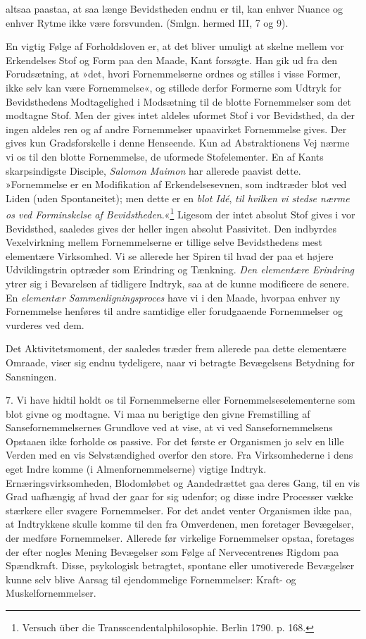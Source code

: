 \documentclass[12pt,a4paper,openany]{book}
\newcommand{\opage}[1]{\marginnote{\footnotesize\textit{[#1]}}}
\begin{document}
altsaa paastaa, at saa længe Bevidstheden endnu er til, kan enhver
Nuance og enhver Rytme ikke være forsvunden. (Smlgn. hermed III, 7 og
9).

En vigtig Følge af Forholdsloven er, at det bliver umuligt at skelne
mellem vor Erkendelses Stof og Form paa den Maade, Kant forsøgte. Han
gik ud fra den Forudsætning, at »det, hvori Fornemmelserne ordnes og
stilles i visse Former, ikke selv kan være Fornemmelse«, og stillede
derfor Formerne som Udtryk for Bevidsthedens Modtagelighed i Modsætning
til de blotte Fornemmelser som det modtagne Stof. Men der gives intet
aldeles uformet Stof i vor Bevidsthed, da der ingen
\opage{144}aldeles ren og af andre Fornemmelser upaavirket Fornemmelse
gives. Der gives kun Gradsforskelle i denne Henseende. Kun ad
Abstraktionens Vej nærme vi os til den blotte Fornemmelse, de uformede
Stofelementer. En af Kants skarpsindigste Disciple, \emph{Salomon
Maimon} har allerede paavist dette. »Fornemmelse er en Modifikation af
Erkendelsesevnen, som indtræder blot ved Liden (uden Spontaneitet); men
dette er en \emph{blot Idé}, \emph{til hvilken vi stedse nærme os ved
Forminskelse af Bevidstheden}.«\footnote[1]{Versuch über die
Transscendentalphilosophie. Berlin 1790. p. 168.} Ligesom der intet
absolut Stof gives i vor Bevidsthed, saaledes gives der heller ingen
absolut Passivitet. Den indbyrdes Vexelvirkning mellem Fornemmelserne er
tillige selve Bevidsthedens mest elementære Virksomhed. Vi se allerede
her Spiren til hvad der paa et højere Udviklingstrin optræder som
Erindring og Tænkning. \emph{Den elementære Erindring} ytrer sig i
Bevarelsen af tidligere Indtryk, saa at de kunne modificere de senere.
En \emph{elementær Sammenligningsproces} have vi i den Maade, hvorpaa
enhver ny Fornemmelse henføres til andre samtidige eller forudgaaende
Fornemmelser og vurderes ved dem.

Det Aktivitetsmoment, der saaledes træder frem allerede paa dette
elementære Omraade, viser sig endnu tydeligere, naar vi betragte
Bevægelsens Betydning for Sansningen.

7. Vi have hidtil holdt os til Fornemmelserne eller
Fornemmelseselementerne som blot givne og modtagne. Vi maa nu berigtige
den givne Fremstilling af Sansefornemmelsernes Grundlove ved at vise, at
vi ved Sansefornemmelsens Opstaaen ikke forholde os passive. For det
første er Organismen jo selv en lille Verden med en vis Selvstændighed
overfor den store. Fra Virksomhederne i dens eget Indre komme (i
Almenfornemmelserne) vigtige Indtryk. Ernæringsvirksomheden, Blodomløbet
og Aandedrættet gaa deres Gang, til en vis Grad uafhængig af hvad der
gaar for sig udenfor; og disse indre Processer vække stærkere eller
svagere Fornemmelser. For det andet venter Organismen ikke paa, at
Indtrykkene skulle komme til den fra Omverdenen, men foretager
Bevægelser, der medføre Fornemmelser. Allerede før virkelige
Fornemmelser opstaa, foretages der efter nogles Mening Bevægelser som
\opage{145}Følge af Nervecentrenes Rigdom paa Spændkraft. Disse,
psykologisk betragtet, spontane eller umotiverede Bevægelser kunne selv
blive Aarsag til ejendommelige Fornemmelser: Kraft- og
Muskelfornemmelser.
\end{document}

